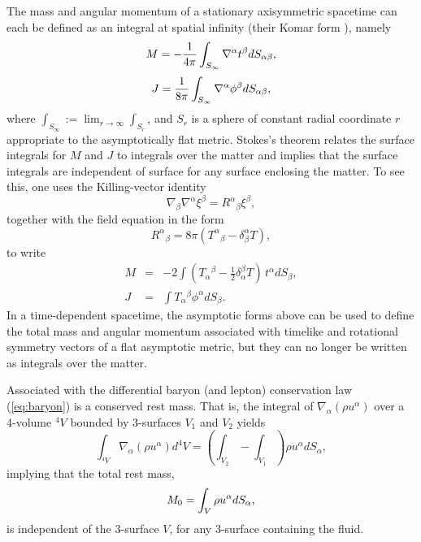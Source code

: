 \documentclass[12pt]{article}
\def\be{\begin{equation}}
\def\ee{\end{equation}}
\def\ba{\begin{eqnarray}}
\def\ea{\end{eqnarray}}
\newcommand{\dis}{\displaystyle}
\begin{document}
The mass and angular momentum of a stationary 
axisymmetric spacetime can each be defined as an integral at 
spatial infinity (their Komar form \cite{komar59}), namely 
\be
M = -\frac1{4\pi}\int_{S_\infty} \nabla^\alpha t^\beta dS_{\alpha\beta},  
\index{mass!rotating star}\index{rotating stars!mass}
\index{Komar mass, angular momentum}
\label{eq:mk}\ee 
%
\be 
J = \frac1{8\pi}\int_{S_\infty} \nabla^\alpha \phi^\beta dS_{\alpha\beta},
\label{eq:jk}\index{angular momentum!rotating star}\index{rotating stars!angular momentum}\index{Komar mass, angular momentum}\ee 
where $\dis\int_{S_\infty} := \lim_{r\rightarrow \infty} \int_{S_r}$, 
and $S_r$ is a sphere of constant radial coordinate $r$ appropriate 
to the asymptotically flat metric.
Stokes's theorem relates the surface integrals for $M$ and $J$
to integrals over the matter and 
implies that the surface integrals are independent of surface for 
any surface enclosing the matter.  To see this, one uses the Killing-vector
identity
\be
\nabla_\beta\nabla^\alpha \xi^\beta = R^\alpha{}_\beta \xi^\beta,
\ee
together with the field equation in the form
\be
R^\alpha{}_\beta = 8\pi (T^\alpha{}_\beta-\delta^\alpha_\beta T),
\ee
to write 
\ba
M &=& - 2 \int(T_\alpha{}^{\beta} -\frac12 \delta_\alpha^\beta T)\, t^\alpha dS_\beta,
\\
J &=& \int T_\alpha{}^{\beta}\phi^\alpha dS_\beta.
\label{eq:angmom}\ea 
In a time-dependent spacetime, the asymptotic forms above 
can be used to define the total mass and angular momentum associated 
with timelike and rotational symmetry vectors of a flat asymptotic 
metric, but they can no longer be written as integrals over the 
matter.  

Associated with the differential baryon (and lepton) conservation law
(\ref{eq:baryon}) is a conserved rest mass.  That is, the integral
of $\nabla_\alpha (\rho u^\alpha)$ over a 4-volume ${}^4V$ bounded by 
3-surfaces $V_1$ and $V_2$ yields
\[ 
\int_{{}^4V}\nabla_\alpha (\rho u^\alpha) d^4V 
 = \left(\int_{V_2} - \int_{V_1}\right)\rho u^\alpha dS_\alpha,
\]
implying that the total rest mass,
\be
M_0 = \int_V \rho u^\alpha dS_\alpha,
\label{eq:m0}\index{rotating stars!rest mass}\ee
is independent of the 3-surface $V$, for any 3-surface containing
the fluid. 
\end{document}
